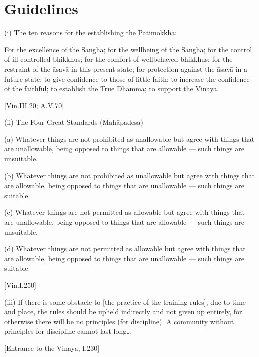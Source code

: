 \chapter{Guidelines}

(i) The ten reasons for the establishing the Patimokkha:

For the excellence of the Sangha; for the wellbeing of the Sangha; for the
control of ill-controlled bhikkhus; for the comfort of wellbehaved bhikkhus; for
the restraint of the āsavā in this present state; for protection against the
āsavā in a future state; to give confidence to those of little faith; to
increase the confidence of the faithful; to establish the True Dhamma; to
support the Vinaya.

[Vin.III.20; A.V.70]

(ii) The Four Great Standards (Mahāpadesa)

(a) Whatever things are not prohibited as unallowable but agree with things that
are unallowable, being opposed to things that are allowable — such things are unsuitable.

(b) Whatever things are not prohibited as unallowable but agree with things that
are allowable, being opposed to things that are unallowable — such things are suitable.

(c) Whatever things are not permitted as allowable but agree with things that
are unallowable, being opposed to things that are allowable — such things are unsuitable.

(d) Whatever things are not permitted as allowable but agree with things that
are allowable, being opposed to things that are unallowable — such things are suitable.

[Vin.I.250]

(iii) If there is some obstacle to [the practice of the training rules], due to time and place, the rules should be upheld indirectly and not given up entirely, for otherwise there will be no principles (for discipline). A community without principles for discipline cannot last long…

[Entrance to the Vinaya, I.230]

